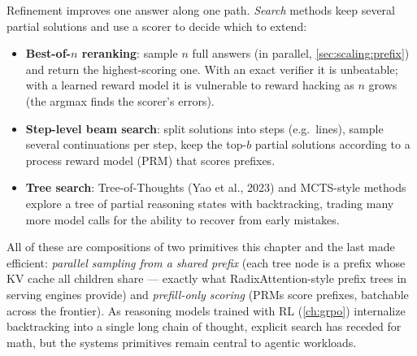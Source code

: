 Refinement improves one answer along one path. \emph{Search} methods keep several partial solutions
and use a scorer to decide which to extend:

\begin{itemize}
  \item \textbf{Best-of-$n$ reranking}: sample $n$ full answers (in parallel, \cref{sec:scaling:prefix})
  and return the highest-scoring one. With an exact verifier it is unbeatable; with a learned reward
  model it is vulnerable to reward hacking as $n$ grows (the argmax finds the scorer's errors).
  \item \textbf{Step-level beam search}: split solutions into steps (e.g.\ lines), sample several
  continuations per step, keep the top-$b$ partial solutions according to a process reward model
  (PRM) that scores prefixes.
  \item \textbf{Tree search}: Tree-of-Thoughts (Yao et al., 2023) and MCTS-style methods explore a
  tree of partial reasoning states with backtracking, trading many more model calls for the ability
  to recover from early mistakes.
\end{itemize}

All of these are compositions of two primitives this chapter and the last made efficient:
\emph{parallel sampling from a shared prefix} (each tree node is a prefix whose KV cache all children
share --- exactly what RadixAttention-style prefix trees in serving engines provide) and
\emph{prefill-only scoring} (PRMs score prefixes, batchable across the frontier). As reasoning
models trained with RL (\cref{ch:grpo}) internalize backtracking into a single long chain of
thought, explicit search has receded for math, but the systems primitives remain central to
agentic workloads.

